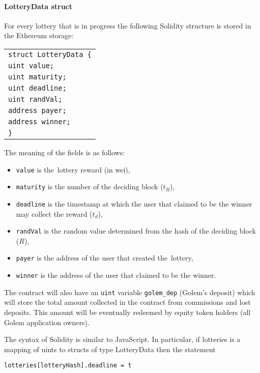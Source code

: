 \documentclass[a4paper]{article}
\begin{document}
    \paragraph{LotteryData struct}

    For every lottery that is in progress the following Solidity structure is stored in the Ethereum storage:

    \begin{tabular}{l}
        \texttt{struct LotteryData \{}\\
        \qquad\texttt{uint value;}\\
        \qquad\texttt{uint maturity;}\\
        \qquad\texttt{uint deadline;}\\
        \qquad\texttt{uint randVal;}\\
        \qquad\texttt{address payer;}\\
        \qquad\texttt{address winner;}\\
        \texttt{\}}
    \end{tabular}

    The meaning of the fields is as follows:
    \begin{itemize}
        \item \texttt{value} is the~lottery reward (in wei),
        \item \texttt{maturity} is the number of the deciding block ($t_R$),
        \item \texttt{deadline} is the timestamp at which the user that claimed to be the winner may collect
            the reward ($t_d$),
        \item \texttt{randVal} is the random value determined from the hash of the deciding block ($R$),
        \item \texttt{payer} is the address of the user that created the~lottery,
        \item \texttt{winner} is the address of the user that claimed to be the winner.
    \end{itemize}

    The contract will also have an \texttt{uint} variable \texttt{golem\_dep} (Golem's deposit) which will store
    the total amount collected in the contract from commissions and lost deposits. This amount will be eventually
    redeemed by equity token holders (all Golem application owners).

    The syntax of Solidity is similar to JavaScript. In particular, if lotteries is a mapping of uints to structs of type LotteryData then the statement
    \begin{center}
        \texttt{lotteries[lotteryHash].deadline = t}
    \end{center}
\end{document}
